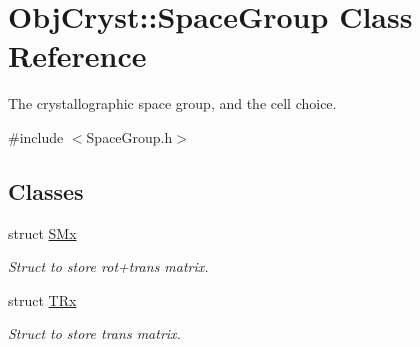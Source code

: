 \hypertarget{class_obj_cryst_1_1_space_group}{}\section{Obj\+Cryst\+::Space\+Group Class Reference}
\label{class_obj_cryst_1_1_space_group}


The crystallographic space group, and the cell choice.  




{\ttfamily \#include $<$Space\+Group.\+h$>$}

\subsection*{Classes}
\begin{DoxyCompactItemize}
\item 
struct \mbox{\hyperlink{struct_obj_cryst_1_1_space_group_1_1_s_mx}{S\+Mx}}
\begin{DoxyCompactList}\small\item\em Struct to store rot+trans matrix. \end{DoxyCompactList}\item 
struct \mbox{\hyperlink{struct_obj_cryst_1_1_space_group_1_1_t_rx}{T\+Rx}}
\begin{DoxyCompactList}\small\item\em Struct to store trans matrix. \end{DoxyCompactList}\end{DoxyCompactItemize}
